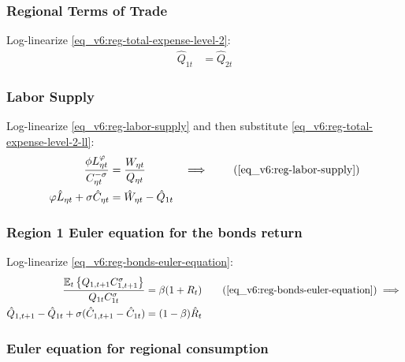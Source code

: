 \documentclass[../thesis.tex]{subfiles}
\begin{document}
\subsubsection*{Regional Terms of Trade}

Log-linearize \ref{eq_v6:reg-total-expense-level-2}:
\begin{align}
	\hat{Q}_{1t} &= \hat{Q}_{2t} \label{eq_v6:reg-total-expense-level-2-ll}
\end{align}


\subsubsection*{Labor Supply}

Log-linearize \ref{eq_v6:reg-labor-supply} and then substitute \ref{eq_v6:reg-total-expense-level-2-ll}:
\begin{alignat}{2}
	\frac{\phi L_{\eta t}^{\varphi}}{C_{\eta t}^{-\sigma}} &= \frac{W_{\eta t}}{Q_{\eta t}} &\implies \tag{\ref{eq_v6:reg-labor-supply}} \\
	\varphi \hat{L}_{\eta t} + \sigma \hat{C}_{\eta t} &= \hat{W}_{\eta t} - \hat{Q}_{1t} & \label{eq_v6:reg-ll-labor-supply}
\end{alignat}


\subsubsection*{Region 1 Euler equation for the bonds return}

Log-linearize \ref{eq_v6:reg-bonds-euler-equation}:
\begin{align}
	\frac{\mathbb{E}_{t} \left\{Q_{1, t+1} C_{1, t+1}^{\sigma} \right\}}{Q_{1t} C_{1t}^{\sigma}} &= \beta (1 + R_{t}) \tag{\ref{eq_v6:reg-bonds-euler-equation}} \implies \\
	\hat{Q}_{1, t+1} - \hat{Q}_{1t} + \sigma (\hat{C}_{1, t+1} - \hat{C}_{1t}) &= (1 - \beta) \hat{R}_{t} \label{eq_v6:reg-bonds-euler-equation-ll}
\end{align}


\subsubsection*{Euler equation for regional consumption}
\end{document}
